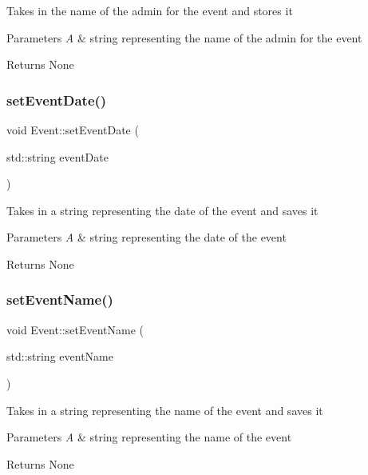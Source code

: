 Takes in the name of the admin for the event and stores it 
\begin{DoxyParams}{Parameters}
{\em A} & string representing the name of the admin for the event \\
\hline
\end{DoxyParams}
\begin{DoxyReturn}{Returns}
None 
\end{DoxyReturn}
\mbox{\label{class_event_a0fbbd58ef1341dfacea38de7795d3667}} 
\subsubsection{\texorpdfstring{set\+Event\+Date()}{setEventDate()}}
{\footnotesize\ttfamily void Event\+::set\+Event\+Date (\begin{DoxyParamCaption}\item[{std\+::string}]{event\+Date }\end{DoxyParamCaption})}

Takes in a string representing the date of the event and saves it 
\begin{DoxyParams}{Parameters}
{\em A} & string representing the date of the event \\
\hline
\end{DoxyParams}
\begin{DoxyReturn}{Returns}
None 
\end{DoxyReturn}
\mbox{\label{class_event_a4c6829c10c6c865759221d57a0f4a64f}} 
\subsubsection{\texorpdfstring{set\+Event\+Name()}{setEventName()}}
{\footnotesize\ttfamily void Event\+::set\+Event\+Name (\begin{DoxyParamCaption}\item[{std\+::string}]{event\+Name }\end{DoxyParamCaption})}

Takes in a string representing the name of the event and saves it 
\begin{DoxyParams}{Parameters}
{\em A} & string representing the name of the event \\
\hline
\end{DoxyParams}
\begin{DoxyReturn}{Returns}
None 
\end{DoxyReturn}
\mbox{\label{class_event_ab573b9da583f00cd5d60934fb594e1ac}} 
